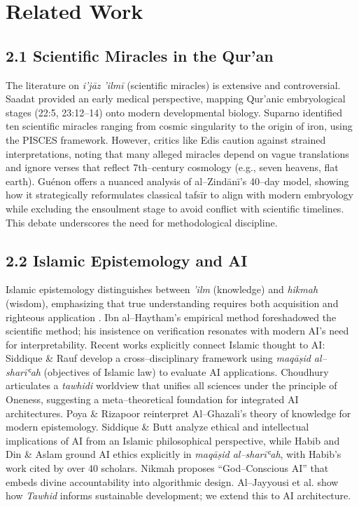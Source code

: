 \documentclass[12pt,twocolumn]{article}
\begin{document}
\section{Related Work}
\subsection*{2.1 Scientific Miracles in the Qur'an}
The literature on \emph{i'jāz 'ilmī} (scientific miracles) is extensive and controversial. Saadat \citep{Saadat2009} provided an early medical perspective, mapping Qur'anic embryological stages (22:5, 23:12--14) onto modern developmental biology. Suparno \citep{Suparno2023} identified ten scientific miracles ranging from cosmic singularity to the origin of iron, using the PISCES framework. However, critics like Edis \citep{Edis} caution against strained interpretations, noting that many alleged miracles depend on vague translations and ignore verses that reflect 7th--century cosmology (e.g., seven heavens, flat earth). Guénon \citep{Guénon2019} offers a nuanced analysis of al--Zindānī's 40--day model, showing how it strategically reformulates classical tafsīr to align with modern embryology while excluding the ensoulment stage to avoid conflict with scientific timelines. This debate underscores the need for methodological discipline.

\subsection*{2.2 Islamic Epistemology and AI}
Islamic epistemology distinguishes between \emph{'ilm} (knowledge) and \emph{hikmah} (wisdom), emphasizing that true understanding requires both acquisition and righteous application \citep{AlGhazali}. Ibn al--Haytham's empirical method \citep{IbnAlHaytham} foreshadowed the scientific method; his insistence on verification resonates with modern AI's need for interpretability. Recent works explicitly connect Islamic thought to AI: Siddique \& Rauf \citep{SiddiqueRauf2025} develop a cross--disciplinary framework using \emph{maqāṣid al--sharīʿah} (objectives of Islamic law) to evaluate AI applications. Choudhury \citep{Choudhury2019} articulates a \emph{tawhidi} worldview that unifies all sciences under the principle of Oneness, suggesting a meta--theoretical foundation for integrated AI architectures. Poya \& Rizapoor \citep{Poya2023} reinterpret Al--Ghazali's theory of knowledge for modern epistemology. Siddique \& Butt \citep{SiddiqueButt2025} analyze ethical and intellectual implications of AI from an Islamic philosophical perspective, while Habib \citep{Habib2025} and Din \& Aslam \citep{Din2025} ground AI ethics explicitly in \emph{maqāṣid al--sharīʿah}, with Habib's work cited by over 40 scholars. Nikmah \citep{Nikmah2025} proposes ``God--Conscious AI'' that embeds divine accountability into algorithmic design. Al--Jayyousi et al. \citep{AlJayyousi2022} show how \emph{Tawhid} informs sustainable development; we extend this to AI architecture.
\end{document}
